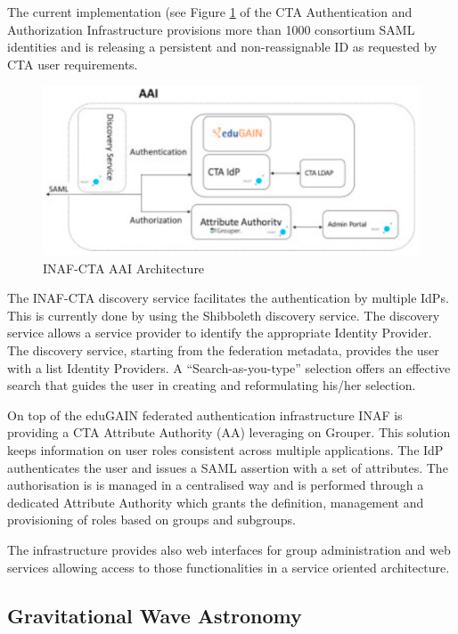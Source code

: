 \documentclass[fleqn,11pt]{wlscirep}
\begin{document}
{The current implementation\cite{costa-jgc}  (see Figure \ref{fig:ctaaai} of the CTA Authentication and Authorization Infrastructure provisions more than 1000  consortium SAML identities and is releasing a persistent and non-reassignable ID as requested by CTA user requirements. 

\begin{figure}[ht!]
  \centering
  \includegraphics[width=0.7\columnwidth]{cta-aai.png}
  \caption{INAF-CTA AAI Architecture}
  \label{fig:ctaaai}
\end{figure}

The INAF-CTA discovery service facilitates the authentication by multiple IdPs. This is currently done by using the Shibboleth discovery service. The discovery service allows a service provider to identify the appropriate Identity Provider. The discovery service, starting from the federation metadata, provides the user with a list Identity Providers. A “Search-as-you-type” selection offers an effective search that guides the user in creating and reformulating his/her selection.

On top of the eduGAIN federated authentication infrastructure INAF is providing a CTA Attribute Authority (AA) leveraging on Grouper\cite{COSTA2018}. This solution keeps information on user roles consistent across multiple applications. The IdP authenticates the user and issues a SAML assertion with a set of attributes. The authorisation is  is managed in a centralised way and is performed through a dedicated Attribute Authority which grants the definition, management and provisioning of roles based on groups and subgroups.

The infrastructure provides also web interfaces for group administration and web services allowing access to those functionalities in a service oriented architecture. 

\subsection{Gravitational Wave Astronomy}

}
\end{document}
